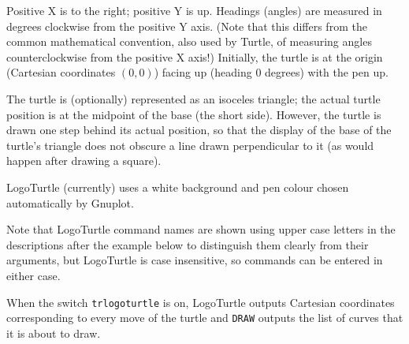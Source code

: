 Positive X is to the right; positive Y is up.  Headings (angles) are
measured in degrees clockwise from the positive Y axis.  (Note that
this differs from the common mathematical convention, also used by
Turtle, of measuring angles counterclockwise from the positive X
axis!)  Initially, the turtle is at the origin (Cartesian coordinates
$(0,0)$) facing up (heading 0 degrees) with the pen up.

The turtle is (optionally) represented as an isoceles triangle; the
actual turtle position is at the midpoint of the base (the short
side).  However, the turtle is drawn one step behind its actual
position, so that the display of the base of the turtle's triangle
does not obscure a line drawn perpendicular to it (as would happen
after drawing a square).




LogoTurtle (currently) uses a white background and pen colour chosen
automatically by Gnuplot.

Note that LogoTurtle command names are shown using upper case letters
in the descriptions after the example below to distinguish them
clearly from their arguments, but LogoTurtle is case insensitive, so
commands can be entered in either case.

When the switch \texttt{trlogoturtle} is on, LogoTurtle outputs
Cartesian coordinates corresponding to every move of the turtle and
\texttt{DRAW} outputs the list of curves that it is about to draw.


